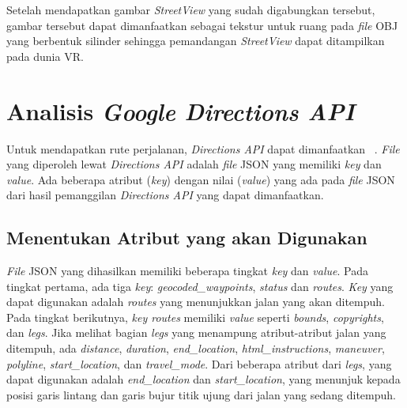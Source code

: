 Setelah mendapatkan gambar \textit{StreetView} yang sudah digabungkan tersebut, gambar tersebut dapat dimanfaatkan sebagai tekstur untuk ruang pada \textit{file} OBJ yang berbentuk silinder sehingga pemandangan \textit{StreetView} dapat ditampilkan pada dunia VR.

\section{Analisis \textit{Google Directions API}}

Untuk mendapatkan rute perjalanan, \textit{Directions API} dapat dimanfaatkan ~\cite{directions-api}. \textit{File} yang diperoleh lewat \textit{Directions API} adalah \textit{file} JSON yang memiliki \textit{key} dan \textit{value}. Ada beberapa atribut (\textit{key}) dengan nilai (\textit{value}) yang ada pada \textit{file} JSON dari hasil pemanggilan \textit{Directions API} yang dapat dimanfaatkan.

\subsection{Menentukan Atribut yang akan Digunakan}
\textit{File} JSON yang dihasilkan memiliki beberapa tingkat \textit{key} dan \textit{value}. Pada tingkat pertama, ada tiga \textit{key}: \textit{geocoded\_waypoints}, \textit{status} dan \textit{routes}. \textit{Key} yang dapat digunakan adalah \textit{routes} yang menunjukkan jalan yang akan ditempuh. Pada tingkat berikutnya, \textit{key routes} memiliki \textit{value} seperti \textit{bounds}, \textit{copyrights}, dan \textit{legs}. Jika melihat bagian \textit{legs} yang menampung atribut-atribut jalan yang ditempuh, ada {\it distance}, {\it duration}, {\it end\_location}, {\it html\_instructions}, {\it maneuver}, {\it polyline}, {\it start\_location}, dan \textit{travel\_mode}. Dari beberapa atribut dari \textit{legs}, yang dapat digunakan adalah \textit{end\_location} dan \textit{start\_location}, yang menunjuk kepada posisi garis lintang dan garis bujur titik ujung dari jalan yang sedang ditempuh. 

